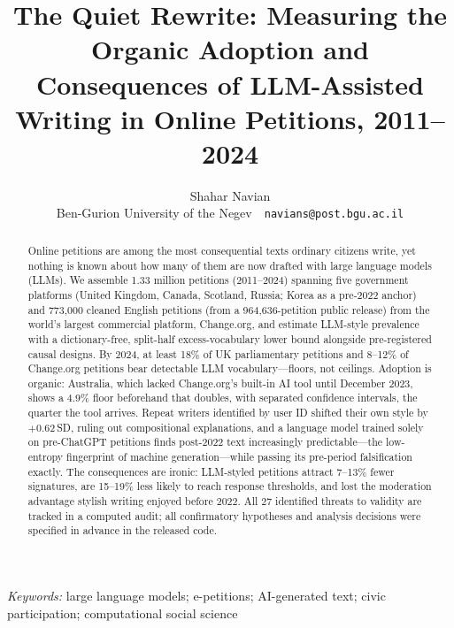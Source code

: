 \documentclass[10pt,twocolumn]{article}
\title{\bfseries The Quiet Rewrite: Measuring the Organic Adoption and Consequences of LLM-Assisted Writing in Online Petitions, 2011--2024}
\author{Shahar Navian\\[2pt]\small Ben-Gurion University of the Negev \,\textperiodcentered\, \texttt{navians@post.bgu.ac.il}}
\date{}
\begin{document}
\maketitle
\vspace{-2em}

\begin{abstract}
\noindent Online petitions are among the most consequential texts ordinary citizens write, yet nothing is known about how many of them are now drafted with large language models (LLMs). We assemble 1.33 million petitions (2011--2024) spanning five government platforms (United Kingdom, Canada, Scotland, Russia; Korea as a pre-2022 anchor) and 773{,}000 cleaned English petitions (from a 964{,}636-petition public release) from the world's largest commercial platform, Change.org, and estimate LLM-style prevalence with a dictionary-free, split-half excess-vocabulary lower bound alongside pre-registered causal designs. By 2024, at least 18\% of UK parliamentary petitions and 8--12\% of Change.org petitions bear detectable LLM vocabulary---floors, not ceilings. Adoption is organic: Australia, which lacked Change.org's built-in AI tool until December 2023, shows a 4.9\% floor beforehand that doubles, with separated confidence intervals, the quarter the tool arrives. Repeat writers identified by user ID shifted their own style by $+0.62$\,SD, ruling out compositional explanations, and a language model trained solely on pre-ChatGPT petitions finds post-2022 text increasingly predictable---the low-entropy fingerprint of machine generation---while passing its pre-period falsification exactly. The consequences are ironic: LLM-styled petitions attract 7--13\% fewer signatures, are 15--19\% less likely to reach response thresholds, and lost the moderation advantage stylish writing enjoyed before 2022. All 27 identified threats to validity are tracked in a computed audit; all confirmatory hypotheses and analysis decisions were specified in advance in the released code.
\end{abstract}

\noindent\textit{Keywords:} large language models; e-petitions; AI-generated text; civic participation; computational social science
\end{document}
